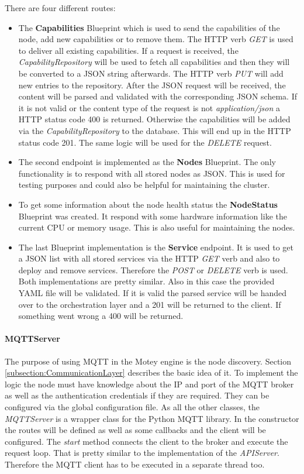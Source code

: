 There are four different routes:
\begin{itemize}
  \item The \textbf{Capabilities} Blueprint which is used to send the capabilities of the node, add new capabilities or to remove them.
  The \ac{HTTP} verb \textit{GET} is used to deliver all existing capabilities.
  If a request is received, the \textit{CapabilityRepository} will be used to fetch all capabilities and then they will be converted to a JSON string afterwards.
  The \ac{HTTP} verb \textit{PUT} will add new entries to the repository.
  After the \ac{JSON} request will be received, the content will be parsed and validated with the corresponding \ac{JSON} schema.
  If it is not valid or the content type of the request is not \textit{application/json} a \ac{HTTP} status code 400 is returned.
  Otherwise the capabilities will be added via the \textit{CapabilityRepository} to the database.
  This will end up in the \ac{HTTP} status code 201.
  The same logic will be used for the \textit{DELETE} request.
  \item The second endpoint is implemented as the \textbf{Nodes} Blueprint.
  The only functionality is to respond with all stored nodes as \ac{JSON}.
  This is used for testing purposes and could also be helpful for maintaining the cluster.
  \item To get some information about the node health status the \textbf{NodeStatus} Blueprint was created.
  It respond with some hardware information like the current \ac{CPU} or memory usage.
  This is also useful for maintaining the nodes.
  \item The last Blueprint implementation is the \textbf{Service} endpoint.
  It is used to get a \ac{JSON} list with all stored services via the \ac{HTTP} \textit{GET} verb and also to deploy and remove services.
  Therefore the \textit{POST} or \textit{DELETE} verb is used.
  Both implementations are pretty similar.
  Also in this case the provided \ac{YAML} file will be validated.
  If it is valid the parsed service will be handed over to the orchestration layer and a 201 will be returned to the client.
  If something went wrong a 400 will be returned.
\end{itemize}

\paragraph{MQTTServer}
The purpose of using \ac{MQTT} in the Motey engine is the node discovery.
Section \ref{subsection:CommunicationLayer} describes the basic idea of it.
To implement the logic the node must have knowledge about the \ac{IP} and port of the \ac{MQTT} broker as well as the authentication credentials if they are required.
They can be configured via the global configuration file.
As all the other classes, the \textit{MQTTServer} is a wrapper class for the Python \ac{MQTT} library.
In the constructor the routes will be defined as well as some callbacks and the client will be configured.
The \textit{start} method connects the client to the broker and execute the request loop.
That is pretty similar to the implementation of the \textit{APIServer}.
Therefore the \ac{MQTT} client has to be executed in a separate thread too.

